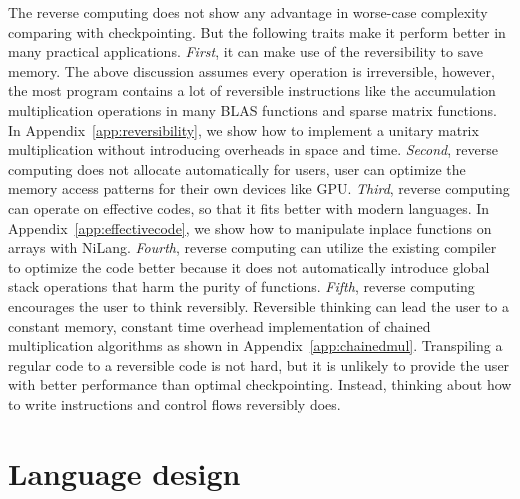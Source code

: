 \documentclass{article}
\newcommand{\<}{\langle}
\renewcommand{\>}{\rangle}
\newcommand{\App}[1]{Appendix~\ref{#1}}
\theoremstyle{definition}\newtheorem{definition}{\textit{Definition}}
\begin{document}
The reverse computing does not show any advantage in worse-case complexity comparing with checkpointing.
But the following traits make it perform better in many practical applications.
\textit{First}, it can make use of the reversibility to save memory. The above discussion assumes every operation is irreversible, however, the most program contains a lot of reversible instructions like the accumulation multiplication operations in many BLAS functions and sparse matrix functions. In \App{app:reversibility}, we show how to implement a unitary matrix multiplication without introducing overheads in space and time.
\textit{Second}, reverse computing does not allocate automatically for users, user can optimize the memory access patterns for their own devices like GPU.
\textit{Third}, reverse computing can operate on effective codes, so that it fits better with modern languages. In \App{app:effectivecode}, we show how to manipulate inplace functions on arrays with NiLang.
\textit{Fourth}, reverse computing can utilize the existing compiler to optimize the code better because it does not automatically introduce global stack operations that harm the purity of functions.
\textit{Fifth}, reverse computing encourages the user to think reversibly. Reversible thinking can lead the user to a constant memory, constant time overhead implementation of chained multiplication algorithms as shown in \App{app:chainedmul}.
Transpiling a regular code to a reversible code is not hard, but it is unlikely to provide the user with better performance than optimal checkpointing. Instead, thinking about how to write instructions and control flows reversibly does.

\section{Language design}\label{sec:lang}
\end{document}
